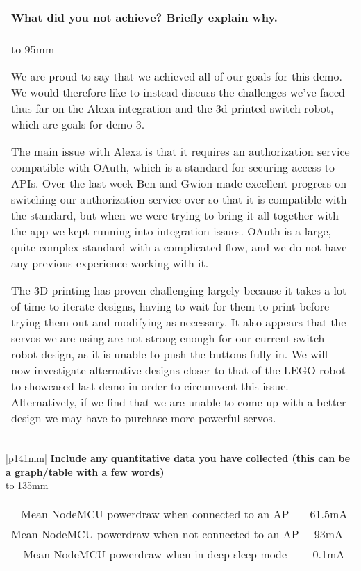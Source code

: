 \documentclass[a4paper]{article}
\newcommand{\colWidth}{141mm}
\begin{document}
\begin{center}

\begin{tabular}{|p{\colWidth}|}
	\hline
	\cellcolor{blue!25}\large
	\textbf{What did you not achieve? Briefly explain why.}
	\\ \hline
	\vtop to 95mm{
		We are proud to say that we achieved all of our goals for this demo.
		We would therefore like to instead discuss the challenges we've faced thus far on the Alexa integration and the 3d-printed switch robot, which are goals for demo 3.

		\vspace{2mm}

		The main issue with Alexa is that it requires an authorization service compatible with OAuth, which is a standard for securing access to APIs.
		Over the last week Ben and Gwion made excellent progress on switching our authorization service over so that it is compatible with the standard,
		but when we were trying to bring it all together with the app we kept running into integration issues. OAuth is a large, quite complex standard
		with a complicated flow, and we do not have any previous experience working with it.

		\vspace{2mm}

		The 3D-printing has proven challenging largely because it takes a lot of time to iterate designs, having to wait for them to print before trying them out and modifying as necessary.
		It also appears that the servos we are using are not strong enough for our current switch-robot design, as it is unable to push the buttons fully in.
		We will now investigate alternative designs closer to that of the LEGO robot to showcased last demo in order to circumvent this issue.
		Alternatively, if we find that we are unable to come up with a better design we may have to purchase more powerful servos.
  }
  \\
  \hline
\end{tabular}
\vskip 5mm


\begin{tabular}{|p{\colWidth}|}
	\hline
	\large
	\textbf{Include any quantitative data you have collected (this can be a graph/table with a few words)}
	\\ \hline
	\vtop to 135mm{
		\begin{tabular}{ | c | c | }
			\hline
			Mean NodeMCU powerdraw when connected to an AP & 61.5mA \\
			Mean NodeMCU powerdraw when not connected to an AP &  93mA \\
			Mean NodeMCU powerdraw when in deep sleep mode & 0.1mA \\
			\hline
		\end{tabular}

}
\end{tabular}
\end{center}
\end{document}
